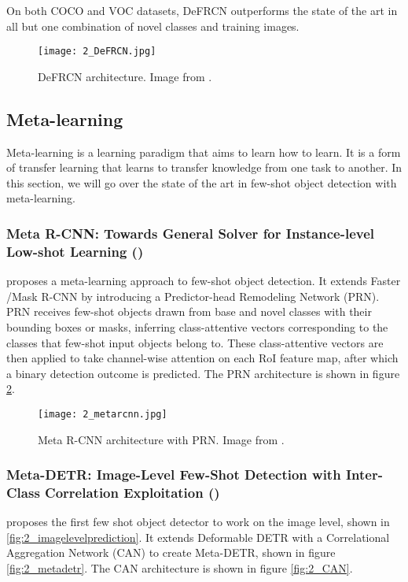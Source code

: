 On both COCO and VOC datasets, DeFRCN outperforms the state of the art in all but one combination of novel classes and training images.

\begin{figure}[h]
	\centering
	\texttt{[image: 2\_DeFRCN.jpg]}
	\caption{\label{fig:2_DeFRCN} DeFRCN architecture. Image from \citet{DeFRCN}.}
\end{figure}

\subsection{Meta-learning}
Meta-learning is a learning paradigm that aims to learn how to learn. It is a form of transfer learning that learns to transfer knowledge from one task to another. In this section, we will go over the state of the art in few-shot object detection with meta-learning.

\subsubsection{Meta R-CNN: Towards General Solver for Instance-level Low-shot Learning (\citet{meta-rcnn})}
\citet{meta-rcnn} proposes a meta-learning approach to few-shot object detection. It extends
Faster /Mask R-CNN\cite{maskrcnn} by introducing a Predictor-head Remodeling Network (PRN). PRN receives few-shot objects drawn from base and novel classes with their bounding boxes or masks, inferring class-attentive vectors corresponding to the classes that few-shot input objects belong to. These class-attentive vectors are then applied to take channel-wise attention on each RoI feature map, after which a binary detection outcome is predicted. The PRN architecture is shown in figure \ref{fig:2_metarcnn}.

\begin{figure}[h]
	\centering
	\texttt{[image: 2\_metarcnn.jpg]}
	\caption{\label{fig:2_metarcnn} Meta R-CNN architecture with PRN. Image from \citet{meta-rcnn}.}
\end{figure}

\subsubsection{Meta-DETR: Image-Level Few-Shot Detection with Inter-Class Correlation Exploitation (\citet{MetaDETR})}
\citet{MetaDETR} proposes the first few shot object detector to work on the image level, shown in \ref{fig:2_imagelevelprediction}. It extends Deformable DETR with a Correlational Aggregation Network (CAN) to create Meta-DETR, shown in figure \ref{fig:2_metadetr}. The CAN architecture is shown in figure \ref{fig:2_CAN}. 

